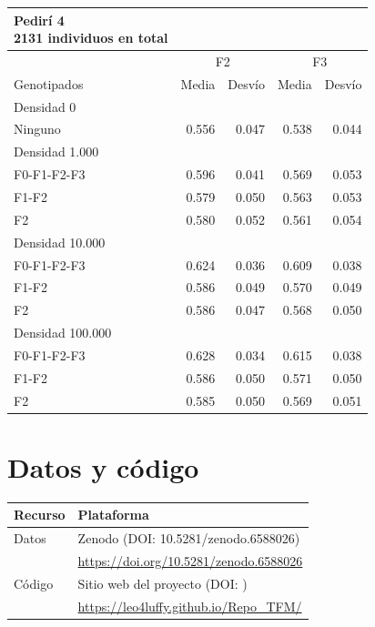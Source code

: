 \documentclass[11pt,spanish,a4paper,oneside,]{book} %
\begin{document}
\begin{longtable}{lrrrr}
\caption*{
{\large Pedirí 4} \\ 
{\small 2131 individuos en total}
} \\ 
\toprule
 & \multicolumn{2}{c}{F2} & \multicolumn{2}{c}{F3} \\ 
 \cmidrule(lr){2-3} \cmidrule(lr){4-5}
Genotipados & Media & Desvío & Media & Desvío \\ 
\midrule
\multicolumn{1}{l}{Densidad 0} \\ 
\midrule
Ninguno & 0.556 & 0.047 & 0.538 & 0.044 \\ 
\midrule
\multicolumn{1}{l}{Densidad 1.000} \\ 
\midrule
F0-F1-F2-F3 & 0.596 & 0.041 & 0.569 & 0.053 \\ 
F1-F2 & 0.579 & 0.050 & 0.563 & 0.053 \\ 
F2 & 0.580 & 0.052 & 0.561 & 0.054 \\ 
\midrule
\multicolumn{1}{l}{Densidad 10.000} \\ 
\midrule
F0-F1-F2-F3 & 0.624 & 0.036 & 0.609 & 0.038 \\ 
F1-F2 & 0.586 & 0.049 & 0.570 & 0.049 \\ 
F2 & 0.586 & 0.047 & 0.568 & 0.050 \\ 
\midrule
\multicolumn{1}{l}{Densidad 100.000} \\ 
\midrule
F0-F1-F2-F3 & 0.628 & 0.034 & 0.615 & 0.038 \\ 
F1-F2 & 0.586 & 0.050 & 0.571 & 0.050 \\ 
F2 & 0.585 & 0.050 & 0.569 & 0.051 \\ 
 \bottomrule
\end{longtable}

\hypertarget{datos-y-cuxf3digo}{%
\section{Datos y código}\label{datos-y-cuxf3digo}}

\begin{longtable}[]{@{}ll@{}}
\toprule
Recurso & Plataforma\tabularnewline
\midrule
\endhead
Datos & Zenodo (DOI: 10.5281/zenodo.6588026)\tabularnewline
& \url{https://doi.org/10.5281/zenodo.6588026}\tabularnewline
Código & Sitio web del proyecto (DOI: )\tabularnewline
& \url{https://leo4luffy.github.io/Repo_TFM/}\tabularnewline
\bottomrule
\end{longtable}

\clearpage\null\thispagestyle{empty}
\end{document}

